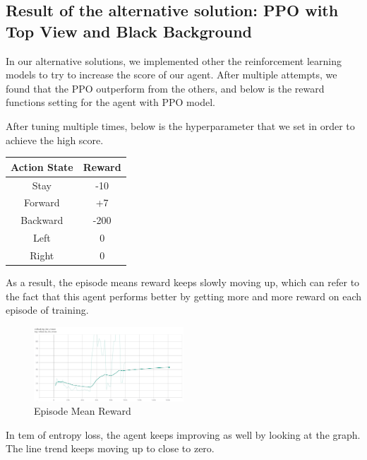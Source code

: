 \documentclass{article}
\begin{document}
\subsection{Result of the alternative solution: PPO with Top View and Black Background}

In our alternative solutions, we implemented other the reinforcement learning models to try to increase the score of our agent. After multiple attempts, we found that the PPO outperform from the others, and below is the reward functions setting for the agent with PPO model. 

After tuning multiple times, below is the hyperparameter that we set in order to achieve the high score. \par 

\begin{center}
    \begin{tabular}{ | c | c |} 
        \hline
        Action State & Reward \\ 
        \hline
        Stay & -10\\ 
        \hline
        Forward & +7\\ 
        \hline
        Backward & -200 \\ 
        \hline
        Left & 0 \\
        \hline
        Right & 0 \\ 
        \hline
    \end{tabular}   
\end{center}

As a result, the episode means reward keeps slowly moving up, which can refer to the fact that this agent performs better by getting more and more reward on each episode of training. \par 

\begin{figure}[h]
    \caption{Episode Mean Reward}
    \centering
    \includegraphics[width=0.5\textwidth]{EMR.png}
\end{figure}

In tem of entropy loss, the agent keeps improving as well by looking at the graph. The line trend keeps moving up to close to zero. \par 
\end{document}

